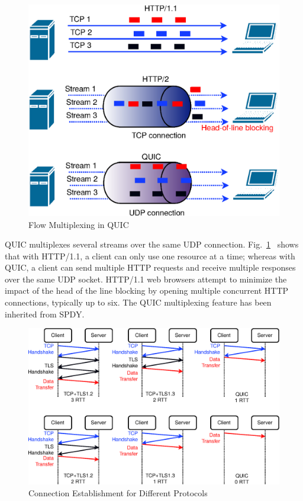 \begin{figure}[!ht]
    \centering
    \includegraphics[width=.8\textwidth]{img/quic/transmission_compare}
    \caption{Flow Multiplexing in QUIC~\cite{carlucci2015http}}
    \label{fig:Quic1}
\end{figure}

QUIC multiplexes several streams over the same UDP connection. Fig.~\ref{fig:Quic1}~\cite{carlucci2015http} shows that with HTTP/1.1, a client can only use one resource at a time; whereas with QUIC, a client can send multiple HTTP requests and receive multiple responses over the same UDP socket. HTTP/1.1 web browsers attempt to minimize the impact of the head of the line blocking by opening multiple concurrent HTTP connections, typically up to
six. The QUIC multiplexing feature has been inherited from SPDY.

\begin{figure}[!ht]
    \centering
    \includegraphics[width=.9\textwidth]{img/quic/quicrrtcompare}
    \caption{Connection Establishment for Different Protocols~\cite{quicisquic}}
    \label{fig:Quic2}
\end{figure}

